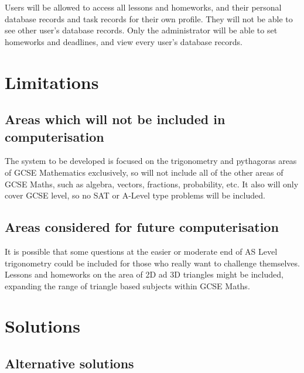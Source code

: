 Users will be allowed to access all lessons and homeworks, and their personal database records and task records for their own profile. They will not be able to see other user's database records. Only the administrator will be able to set homeworks and deadlines, and view every user's database records.

\section{Limitations}

\subsection{Areas which will not be included in computerisation}

The system to be developed is focused on the trigonometry and pythagoras areas of GCSE Mathematics exclusively, so will not include all of the other areas of GCSE Maths, such as algebra, vectors, fractions, probability, etc. It also will only cover GCSE level, so no SAT or A-Level type problems will be included.

\subsection{Areas considered for future computerisation}

It is possible that some questions at the easier or moderate end of AS Level trigonometry could be included for those who really want to challenge themselves. Lessons and homeworks on the area of 2D ad 3D triangles might be included, expanding the range of triangle based subjects within GCSE Maths.

\section{Solutions}

\subsection{Alternative solutions}

